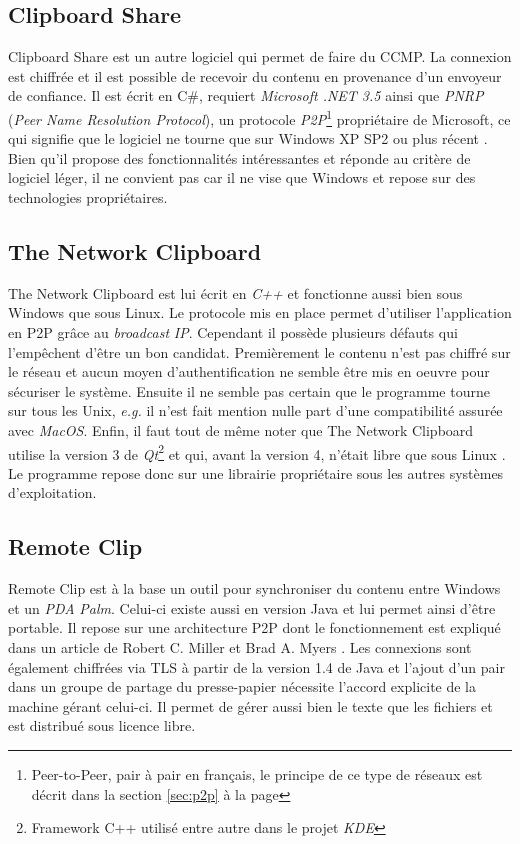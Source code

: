 \subsection{Clipboard Share}
Clipboard Share \cite{clipshare} est un autre logiciel qui permet de faire
du CCMP. La connexion est chiffrée et il est possible de recevoir
du contenu en provenance d'un envoyeur de confiance. Il est écrit en C\#,
requiert \emph{Microsoft .NET 3.5} ainsi que \emph{PNRP} (\emph{Peer Name
Resolution Protocol}), un protocole \emph{P2P}\footnote{Peer-to-Peer, pair à
pair en français, le principe de ce type de réseaux est décrit dans la section
\ref{sec:p2p} à la page \pageref{sec:p2p}} propriétaire de Microsoft,
ce qui signifie que le logiciel ne tourne que sur Windows XP SP2 ou plus
récent \cite{wiki:pnrp}. Bien qu'il propose des fonctionnalités intéressantes
et réponde au critère de logiciel léger, il ne convient pas car il ne vise
que Windows et repose sur des technologies propriétaires.

\subsection{The Network Clipboard}
The Network Clipboard \cite{netclip} est lui écrit en \emph{C++} et fonctionne
aussi bien sous Windows que sous Linux. Le protocole mis en place permet
d'utiliser l'application en P2P grâce au \emph{broadcast} \emph{IP}.
Cependant il possède plusieurs défauts qui l'empêchent d'être un bon candidat.
Premièrement le contenu n'est pas chiffré sur le réseau et aucun moyen
d'authentification ne semble être mis en oeuvre pour sécuriser le système.
Ensuite il ne semble pas certain que le programme tourne sur tous les Unix,
\emph{e.g.} il n'est fait mention nulle part d'une compatibilité assurée
avec \emph{MacOS}. Enfin, il faut tout de même noter que The Network
Clipboard utilise la version 3 de \emph{Qt}\footnote{Framework C++ utilisé
entre autre dans le projet \emph{KDE}} et qui, avant la version 4, n'était
libre que sous Linux \cite{wiki:qt}.
Le programme repose donc sur une librairie propriétaire sous les autres
systèmes d'exploitation.

\subsection{Remote Clip}
Remote Clip \cite{remoteclip} est à la base un outil pour synchroniser
du contenu entre Windows et un \emph{PDA} \emph{Palm}. Celui-ci existe
aussi en version Java et lui permet ainsi d'être portable. Il repose sur une
architecture P2P dont le fonctionnement est expliqué dans un article de Robert
C. Miller et Brad A. Myers \cite{Miller99syncclips}. Les connexions sont
également chiffrées via TLS à partir de la version 1.4 de Java et
l'ajout d'un pair dans un groupe de partage du presse-papier nécessite
l'accord explicite de la machine gérant celui-ci. Il permet de gérer aussi
bien le texte que les fichiers et est distribué sous licence libre.

